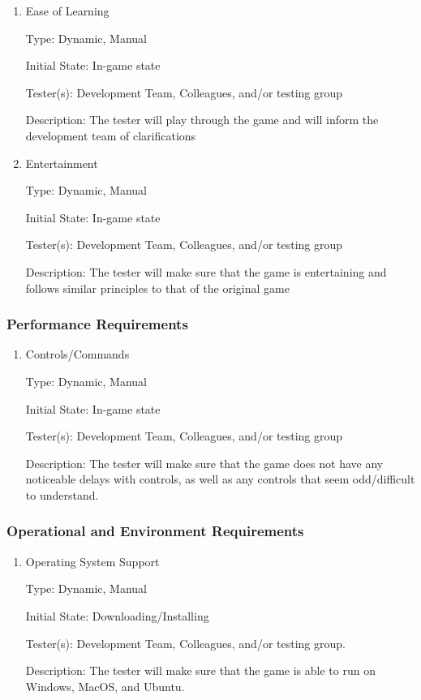\documentclass[12pt, titlepage]{article}
\begin{document}
\begin{enumerate}

\item{Ease of Learning\\}

Type: Dynamic, Manual

Initial State: In-game state

Tester(s): Development Team, Colleagues, and/or testing group

Description: The tester will play through the game and will inform the development team of clarifications

\item{Entertainment\\}

Type: Dynamic, Manual

Initial State: In-game state

Tester(s): Development Team, Colleagues, and/or testing group

Description: The tester will make sure that the game is entertaining and follows similar principles to that of the original game

\end{enumerate}

\subsubsection{Performance Requirements}

\begin{enumerate}

\item{Controls/Commands\\}

Type: Dynamic, Manual

Initial State: In-game state

Tester(s): Development Team, Colleagues, and/or testing group

Description: The tester will make sure that the game does not have any noticeable delays with controls, as well as any controls that seem odd/difficult to understand.

\end{enumerate}

\subsubsection{Operational and Environment Requirements}

\begin{enumerate}

\item{Operating System Support\\}

Type: Dynamic, Manual

Initial State: Downloading/Installing

Tester(s): Development Team, Colleagues, and/or testing group.

Description: The tester will make sure that the game is able to run on Windows, MacOS, and Ubuntu.

\end{enumerate}
\end{document}
